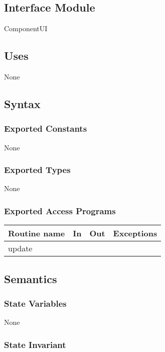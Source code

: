 \documentclass[12pt]{article}
\begin{document}
\subsection*{Interface Module}

ComponentUI

\subsection* {Uses}

None

\subsection* {Syntax}

\subsubsection* {Exported Constants}

None

\subsubsection* {Exported Types}

None

\subsubsection* {Exported Access Programs}

\begin{tabular}{| l | l | l | p{6cm} |}
\hline
\textbf{Routine name} & \textbf{In} & \textbf{Out} & \textbf{Exceptions}\\
\hline
update & & &  \\
\hline
\end{tabular}

\subsection* {Semantics}

\subsubsection* {State Variables}

None

\subsubsection* {State Invariant}
\end{document}

